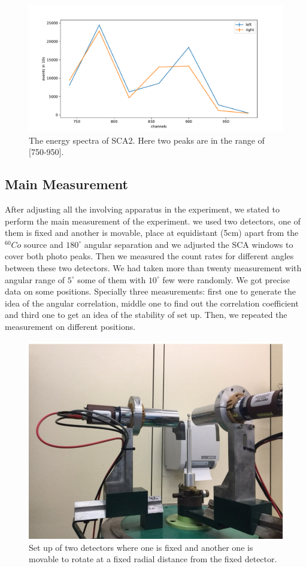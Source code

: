 \begin{figure}[ht]
	\centering
	\includegraphics[width=0.8\linewidth]{./figs/sca2.pdf}
	\caption{The energy spectra of SCA2. Here two peaks are in the range of [750-950].}%
	\label{fig:sca2}
\end{figure}

\newpage
\subsection{Main Measurement}
After adjusting all the involving apparatus in the experiment, we stated to perform the main measurement of the experiment. we used two detectors, one of them is fixed and another is movable, place at equidistant (5cm) apart from the $ ^{60}Co$ source and  $180^{\circ} $ angular separation and we adjusted the SCA windows to cover both photo peaks. Then we measured the count rates for different angles between these two detectors. We had taken more than twenty measurement with angular range of $5^{\circ}$ some of them with $10^{\circ}$ few were randomly. We got precise data on some positions. Specially three measurements: first one to generate the idea of the angular correlation, middle one to find out the correlation coefficient and third one to get an idea of the stability of set up. Then, we repeated the measurement on different positions.

\begin{figure}[ht]
	\centering
	\includegraphics[width=0.8\linewidth]{./figs/detectors.jpg}
	\caption{Set up of two detectors where one is fixed and another one is movable to rotate at a fixed radial distance from the fixed detector.}%
	\label{fig:detect}
\end{figure}


